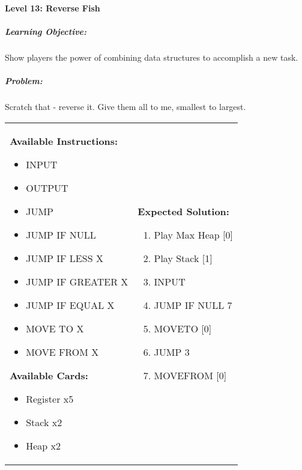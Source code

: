 \paragraph{Level 13: Reverse Fish}
\subparagraph{Learning Objective:} Show players the power of combining data structures to accomplish a new task.

\subparagraph{Problem:} Scratch that - reverse it. Give them all to me, smallest to largest.

\begin{center}
    \begin{tabular}{ | m{5cm} | m{9cm} | } 
        \hline
            \textbf{Available Instructions:} 
            \begin{itemize}
                \setlength\itemsep{-.35em}
                \item INPUT
                \item OUTPUT
                \item JUMP
                \item JUMP IF NULL
                \item JUMP IF LESS X
                \item JUMP IF GREATER X
		\item JUMP IF EQUAL X
                \item MOVE TO X
                \item MOVE FROM X
            \end{itemize}
            \textbf{Available Cards:} 
            \begin{itemize}
                \setlength\itemsep{-.35em}
                \item Register x5
                \item Stack x2
                \item Heap x2
            \end{itemize}& 
            \textbf{Expected Solution:} 
            \begin{enumerate}
                \setlength\itemsep{-.35em}
                \item Play Max Heap [0]
                \item Play Stack [1]
                \item INPUT
                \item JUMP IF NULL 7
                \item MOVETO [0]
                \item JUMP 3
                \item MOVEFROM [0]

\end{enumerate}
\end{tabular}
\end{center}
